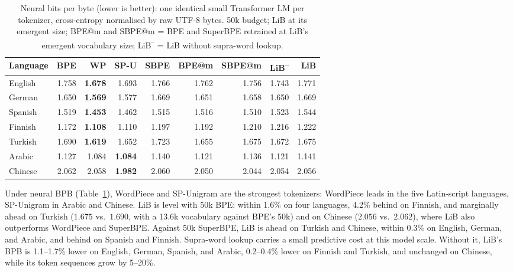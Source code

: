 \documentclass[pdflatex,sn-apa]{sn-jnl}
\begin{document}
\begin{table}[t]
\centering
\small
\setlength{\tabcolsep}{4pt}
\begin{tabular}{lrrrrrrrr}
\toprule
\textbf{Language} & \textbf{BPE} & \textbf{WP} & \textbf{SP-U} & \textbf{SBPE}
& \textbf{BPE@m} & \textbf{SBPE@m}
& \textbf{LiB\textsuperscript{--}} & \textbf{LiB} \\
\midrule
English  & 1.758 & \textbf{1.678} & 1.693 & 1.766 & 1.762 & 1.756 & 1.743 & 1.771 \\
German   & 1.650 & \textbf{1.569} & 1.577 & 1.669 & 1.651 & 1.658 & 1.650 & 1.669 \\
Spanish  & 1.519 & \textbf{1.453} & 1.462 & 1.515 & 1.516 & 1.510 & 1.523 & 1.544 \\
Finnish  & 1.172 & \textbf{1.108} & 1.110 & 1.197 & 1.192 & 1.210 & 1.216 & 1.222 \\
Turkish  & 1.690 & \textbf{1.619} & 1.652 & 1.723 & 1.655 & 1.675 & 1.672 & 1.675 \\
Arabic   & 1.127 & 1.084 & \textbf{1.084} & 1.140 & 1.121 & 1.136 & 1.121 & 1.141 \\
Chinese  & 2.062 & 2.058 & \textbf{1.982} & 2.060 & 2.050 & 2.044 & 2.054 & 2.056 \\
\bottomrule
\end{tabular}
\caption{Neural bits per byte (lower is better): one identical small
Transformer LM per tokenizer, cross-entropy normalised by raw UTF-8 bytes.
50k budget; LiB at its emergent size; BPE@m and SBPE@m = BPE and SuperBPE
retrained at LiB's emergent vocabulary size; LiB\textsuperscript{--} = LiB
without supra-word lookup.}
\label{tab:bpb}
\end{table}

Under neural BPB (Table~\ref{tab:bpb}), WordPiece and SP-Unigram are the
strongest tokenizers: WordPiece leads in the five Latin-script languages,
SP-Unigram in Arabic and Chinese. LiB is level with 50k BPE: within 1.6\% on
four languages, 4.2\% behind on Finnish, and marginally ahead on Turkish
($1.675$ vs.\ $1.690$, with a 13.6k vocabulary against BPE's 50k) and on
Chinese ($2.056$ vs.\ $2.062$), where LiB also outperforms WordPiece and
SuperBPE.
Against 50k SuperBPE, LiB is ahead on Turkish and Chinese, within 0.3\% on
English, German, and Arabic, and behind on Spanish and Finnish.
Supra-word lookup carries a small predictive cost at this model scale.
Without it, LiB's BPB is 1.1--1.7\% lower on English, German, Spanish, and
Arabic, 0.2--0.4\% lower on Finnish and Turkish, and unchanged on Chinese,
while its token sequences grow by 5--20\%.
\end{document}
